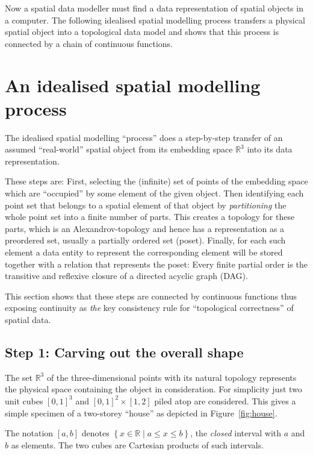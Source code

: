 \documentclass[5p]{elsarticle}
\newcommand{\mathpset}[2]{\left\{#1\mid #2\right\}}
\newcommand{\qq}[1]{``#1''}
\begin{document}
Now a spatial data modeller must find a data representation of spatial objects in 
a computer. The following idealised spatial modelling process transfers a physical 
spatial object into a topological data model and shows that this process is connected 
by a chain of continuous functions. 


\section{An idealised spatial modelling process}

The idealised spatial modelling \qq{process} does a step-by-step transfer of an 
assumed \qq{real-world} spatial object from its embedding space $\mathbb{R}^3$ into its 
data representation. 

These steps are: 
First, selecting the (infinite) set of points of the embedding space which are 
\qq{occupied} by some element of the given object. 
Then identifying each point set that belongs to a spatial element of that object 
by \emph{partitioning} the whole point set into a finite number of parts. 
This creates a topology for these parts, which is an Alexandrov-topology \cite{Alexandroff}
and hence has a representation as a preordered set, usually a partially ordered set (poset). 
Finally, for each such element a data entity to represent the corresponding 
element will be stored together with a relation that represents the poset: 
Every finite partial order is the transitive and reflexive closure of a directed 
acyclic graph (DAG). 

This section shows that these steps are connected by continuous functions thus 
exposing continuity as \emph{the} key consistency rule for \qq{topological correctness} 
of spatial data.  

\subsection{Step 1: Carving out the overall shape}

The set $\mathbb{R}^3$ of the three-dimensional points with its natural topology represents the 
physical space containing the object in consideration. 
For simplicity just two unit cubes $[0,1]^3$ and $[0,1]^2\times[1,2]$ piled atop are considered. 
This gives a simple specimen of a two-storey \qq{house} as depicted in Figure~\ref{fig:house}. 

The notation $[a,b]$ denotes $\mathpset{x\in\mathbb{R}}{a\le x\le b}$, the \emph{closed} interval
with $a$ and $b$ as elements. The two cubes are Cartesian products of such intervals. 
\end{document}
